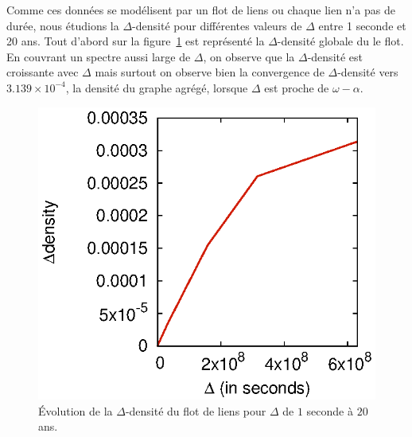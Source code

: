 Comme ces données se modélisent par un flot de liens ou chaque lien n'a pas de durée, nous étudions la $\Delta$-densité pour différentes valeurs de $\Delta$ entre 1 seconde et 20 ans.
Tout d'abord sur la figure~\ref{fig:dens_fil_discusion} est représenté la $\Delta$-densité globale du le flot.
En couvrant un spectre aussi large de $\Delta$, on observe que la $\Delta$-densité est croissante avec $\Delta$ mais surtout on observe bien la convergence de $\Delta$-densité vers $3.139\times 10^{-4}$, la densité du graphe agrégé, lorsque $\Delta$ est proche de $\omega - \alpha$.

\begin{figure}
	\centering
	\includegraphics[width=0.48\linewidth]{img/mailing/global_linlin.eps}
	\caption{Évolution de la $\Delta$-densité du flot de liens pour $\Delta$ de $1$ seconde à $20$ ans. }
	\label{fig:dens_fil_discusion}
\end{figure}

